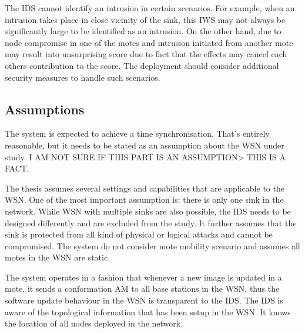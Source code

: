 \documentclass[conference,final]{IEEEtran}
\begin{document}
The IDS cannot identify an intrusion in certain scenarios.
For example, when an intrusion takes place in close vicinity of the sink, this IWS may not always be significantly large to be identified as an intrusion. On the other hand, due to node compromise in one of the motes and intrusion initiated from another mote may result into unsurprising score due to fact that the effects may cancel each others contribution to the score.
The deployment should consider additional security measures to handle such scenarios.


\subsection{Assumptions} %
\label{sc:assump}

The system is expected to achieve a time synchronisation. 
That's entirely reasonable, but it needs to be stated as an assumption about the WSN under study.
I AM NOT SURE IF THIS PART IS AN ASSUMPTION> THIS IS A FACT.


The thesis assumes several settings and capabilities that are applicable to the WSN.
One of the most important assumption is: there is only one sink in the network. While WSN with multiple sinks are also possible, the IDS needs to be designed differently and are excluded from the study. 
It further assumes that the sink is protected from all kind of physical or logical attacks and cannot be compromised. 
The system do not consider mote mobility scenario and assumes all motes in the WSN are static.

The system operates in a fashion that whenever a new image is updated in a mote, it sends a conformation AM to all base stations in the WSN, thus the software update behaviour in the WSN is transparent to the IDS.
The IDS is aware of the topological information that has been setup in the WSN.
It knows the location of all nodes deployed in the network.
\end{document}
